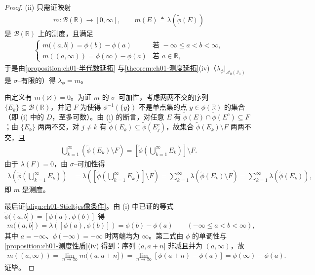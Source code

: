\documentclass[../../main.tex]{subfiles}%
\begin{document}
\begin{proof}
(ii) 只需证映射
\begin{align*}
m:\mathcal{B}(\mathbb{R})\to[0,\infty],\qquad m(E)\triangleq\lambda(\widetilde{\phi}(E))
\end{align*}
是 $\mathcal{B}(\mathbb{R})$ 上的测度，且满足
\begin{align}
\begin{cases}
m((a,b])=\phi(b)-\phi(a) & \text{若 }-\infty\leqslant a<b<\infty,\\
m((a,\infty))=\phi(\infty)-\phi(a) & \text{若 }a\in\mathbb{R},
\end{cases} 
\label{align:ch01-Stieltjes像条件}
\end{align}
于是由\cref{proposition:ch01-半代数延拓} 与\cref{theorem:ch01-测度延拓}(iv)（$\lambda_\phi|_{\mathcal{A}_0(\mathcal{I}_1)}$ 是 $\sigma$--有限的）得 $\lambda_\phi=m$。

由定义有 $m(\varnothing)=0$。为证 $m$ 的 $\sigma$--可加性，考虑两两不交的序列 $\{E_k\}\subseteq\mathcal{B}(\mathbb{R})$，并记 $F$ 为使得 $\phi^{-1}(\{y\})$ 不是单点集的点 $y\in\phi(\mathbb{R})$ 的集合（即 (i) 中的 $D$，至多可数）。由 (i) 的断言，对任意 $E$ 有 $\widetilde{\phi}(E)\cap\widetilde{\phi}(E^c)\subseteq F$；由 $\{E_k\}$ 两两不交，对 $j\neq k$ 有 $\widetilde{\phi}(E_k)\subseteq\widetilde{\phi}(E_j^c)$，故集合 $\widetilde{\phi}(E_k)\setminus F$ 两两不交，且
\begin{align*}
\bigcup_{k=1}^\infty\left(\widetilde{\phi}(E_k)\setminus F\right)=\left[\widetilde{\phi}\left(\bigcup_{k=1}^\infty E_k\right)\right]\setminus F.
\end{align*}
由于 $\lambda(F)=0$，由 $\sigma$--可加性得
\begin{align*}
\lambda\left(\widetilde{\phi}\left(\bigcup_{k=1}^\infty E_k\right)\right)
&=\lambda\left(\left[\widetilde{\phi}\left(\bigcup_{k=1}^\infty E_k\right)\right]\setminus F\right)
=\sum_{k=1}^\infty\lambda\left(\widetilde{\phi}(E_k)\setminus F\right)
=\sum_{k=1}^\infty\lambda\left(\widetilde{\phi}(E_k)\right),
\end{align*}
即 $m$ 是测度。

最后证\eqref{align:ch01-Stieltjes像条件}。由 (i) 中已证的等式 $\widetilde{\phi}((a,b])=[\phi(a),\phi(b)]$ 得
\begin{align*}
m((a,b])=\lambda([\phi(a),\phi(b)])=\phi(b)-\phi(a)\qquad(-\infty\leqslant a<b<\infty),
\end{align*}
其中 $a=-\infty$、$\phi(-\infty)=-\infty$ 时两端均为 $\infty$。第二式由 $\phi$ 的单调性与\cref{proposition:ch01-测度性质}(iv) 得到：序列 $(a,a+n]$ 非减且并为 $(a,\infty)$，故
\begin{align*}
m((a,\infty))=\lim_{n\to\infty}m((a,a+n])=\lim_{n\to\infty}[\phi(a+n)-\phi(a)]=\phi(\infty)-\phi(a).
\end{align*}
证毕。
\end{proof}
\end{document}
